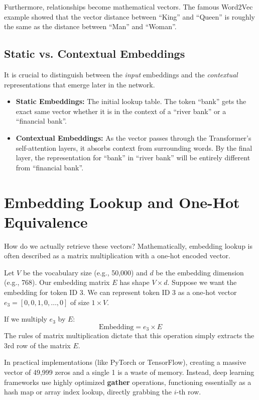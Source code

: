 \documentclass[11pt, a4paper]{article}
\begin{document}
Furthermore, relationships become mathematical vectors. The famous Word2Vec example showed that the vector distance between ``King'' and ``Queen'' is roughly the same as the distance between ``Man'' and ``Woman''. 

\subsection{Static vs. Contextual Embeddings}
It is crucial to distinguish between the \textit{input} embeddings and the \textit{contextual} representations that emerge later in the network.
\begin{itemize}
    \item \textbf{Static Embeddings:} The initial lookup table. The token ``bank'' gets the exact same vector whether it is in the context of a ``river bank'' or a ``financial bank''.
    \item \textbf{Contextual Embeddings:} As the vector passes through the Transformer's self-attention layers, it absorbs context from surrounding words. By the final layer, the representation for ``bank'' in ``river bank'' will be entirely different from ``financial bank''.
\end{itemize}

\section{Embedding Lookup and One-Hot Equivalence}

How do we actually retrieve these vectors? Mathematically, embedding lookup is often described as a matrix multiplication with a one-hot encoded vector.

Let $V$ be the vocabulary size (e.g., 50,000) and $d$ be the embedding dimension (e.g., 768). Our embedding matrix $E$ has shape $V \times d$.
Suppose we want the embedding for token ID 3. We can represent token ID 3 as a one-hot vector $e_3 = [0, 0, 1, 0, \dots, 0]$ of size $1 \times V$. 

If we multiply $e_3$ by $E$:
$$ \text{Embedding} = e_3 \times E $$
The rules of matrix multiplication dictate that this operation simply extracts the 3rd row of the matrix $E$. 

In practical implementations (like PyTorch or TensorFlow), creating a massive vector of 49,999 zeros and a single 1 is a waste of memory. Instead, deep learning frameworks use highly optimized \textbf{gather} operations, functioning essentially as a hash map or array index lookup, directly grabbing the $i$-th row.
\end{document}

